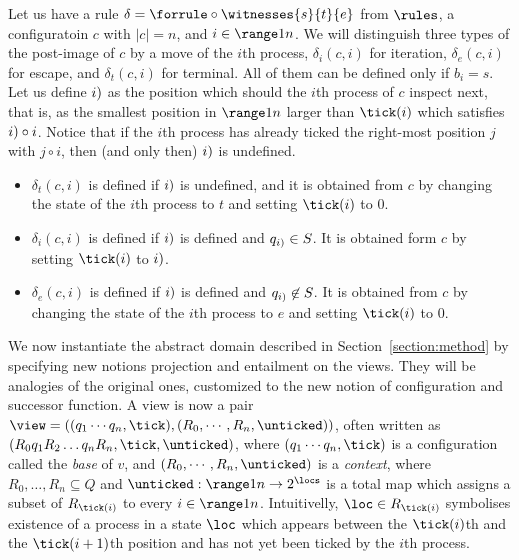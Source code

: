 Let us have a rule $\delta = \forrule \circ \witnesses {s} {t} {e}$ from $\rules$, a configuratoin $c$ with $|c| = n$,
and $i\in\range 1 {n}$. 
We will distinguish three types of the post-image of $c$ by a move of the $i$th process, $\delta_i(c,i)$ for iteration, $\delta_e(c,i)$ for escape, and $\delta_t(c,i)$ for terminal. All of them can be defined only if $b_i = s$. 
Let us define $\next(i)$ as the position which should the $i$th process of $c$ inspect next, that is, as the smallest position in $\range 1 n$ larger than $\tick(i)$ which satisfies $\next(i)\circ i$. Notice that if the $i$th process has already ticked the right-most position $j$ with $j\circ i$, then (and only then) $\next(i)$ is undefined.
\begin{itemize}
\item
$\delta_t(c,i)$ is defined if $\next(i)$ is undefined, and it is obtained from $c$ by changing the state of the $i$th process to $t$ and setting $\tick(i)$ to $0$. 
\item
$\delta_i(c,i)$ is defined if $\next(i)$ is defined and $q_{\next(i)}\in S$. It is obtained form $c$ by
setting $\tick(i)$ to $\next(i)$.
\item
$\delta_e(c,i)$ is defined if $\next(i)$ is defined and $q_{\next(i)}\not\in S$. It is obtained  from $c$ by changing the state of the $i$th process to $e$ and  setting $\tick(i)$ to $0$.
\end{itemize}

%
We now instantiate the abstract domain described in Section~\ref{section:method} by specifying new notions projection and entailment on the views. They will be analogies of the original ones, customized to the new notion of configuration and successor function.
A view is now a 
pair $\view = ((q_1 \cdots q_n,\tick),(R_0,\cdots,R_n,\unticked))$, often written as $(R_0q_1R_2\ldots q_nR_{n},\tick,\unticked)$, where
$(q_1\cdots q_n,\tick)$ is a configuration called the \emph{base} of $v$, 
and $(R_0,\cdots,R_n,\unticked)$ is a \emph{context}, where
$R_0,\ldots,R_{n}\subseteq Q$ and
$\unticked:\range 1 n\rightarrow 2^\locs$ is a total map which assigns 
a subset of $R_{\tick(i)}$ 
to every $i\in\range 1 n$. 
Intuitivelly, $\loc \in R_{\tick(i)}$ symbolises existence of a process in a state $\loc$ which 
appears between the ${\tick(i)}$th and the ${\tick(i+1)}$th position and has not yet been ticked by the $i$th process. 

